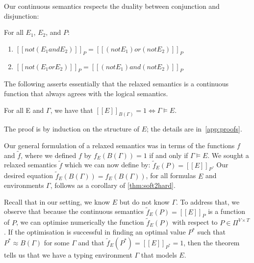 \documentclass[acmsmall,nonacm]{acmart}\settopmatter{printfolios=true,printccs=false,printacmref=false}
\newcommand{\qqpi}[2]{[\![#2]\!]_{#1}}
\begin{document}
Our continuous semantics respects the duality between conjunction and disjunction:
\begin{lemma}[Duality]
For all $E_1$, $E_2$, and $P$:
\begin{enumerate}
    \item $\qqpi{P}{\mathrel{not}(E_1 \mathrel{and} E_2)} = \qqpi{P}{(\mathrel{not} E_1) \mathrel{or} (\mathrel{not} E_2)}$
    \item $\qqpi{P}{\mathrel{not}(E_1 \mathrel{or} E_2)} = \qqpi{P}{(\mathrel{not} E_1) \mathrel{and} (\mathrel{not} E_2)}$
\end{enumerate}
\end{lemma}
\iffalse
\begin{verbatim}
    not(E1 and E2) = (not E1) or (not E2)

[LHS]P = 1 - ([E1]P * [E2]P)
[RHS]P = (1-[E1]P) or (1-[E2]P)
 = (1-[E1]P) + (1-[E2]P) - ((1-[E1]P) * (1-[E2]P))
 = (1-[E1]P) + (1-[E2]P) - (1 -[E1]P -[E2]P + ([E1]P * [E2]P))
 = (1-[E1]P) + (1-[E2]P) -  1 + [E1]P + [E2]P - ([E1]P * [E2]P))
 = 1 - ([E1]P * [E2]P)
\end{verbatim}
\begin{verbatim}
    not(E1 or E2) = (not E1) and (not E2)

[LHS]P = 1 - ([E1]P + [E2]P - ([E1]P * [E2]P))
 = 1 - [E1]P - [E2]P + ([E1]P * [E2]P)
[RHS]P = (1-[E1]P) * (1-[E2]P)
 = 1 -[E1]P - [E2]P + ([E1]P * [E2]P)
\end{verbatim}
\fi %

The following asserts essentially that the relaxed semantics is a continuous function that always agrees with the logical semantics.
\begin{theorem}[Relaxation]\label{thm:soft2hard}
For all E and $\Gamma$, we have that $\qqpi{B(\Gamma)}{E} = 1 \Leftrightarrow \Gamma \models E$.
\end{theorem}
The proof is by induction on the structure of $E$;
the details are in~\cref{app:proofs}.

Our general formulation of a relaxed semantics was in terms of the functions $f$ and $\tilde{f}$,
where we defined $f$ by $f_{E}(B(\Gamma)) = 1$ if and only if $\Gamma \models E$.
We sought a relaxed semantics $\tilde{f}$ which we can now define by: $\tilde{f}_E(P) = \qqpi{P}{E}$.
%
Our desired equation $\tilde{f}_{E}(B(\Gamma)) = f_E(B(\Gamma))$,
for all formulas $E$ and environments $\Gamma$,
follows as a corollary of \cref{thm:soft2hard}.

Recall that in our setting, we know $E$ but
do not know $\Gamma$.
To address that, we observe that because the continuous semantics $\tilde{f}_E(P) = \qqpi{P}{E}$ is a function of $P$, we can optimise numerically
the function $\tilde{f}_E(P)$ with respect to $P \in \Pi^{V \times T}$.
If the optimisation is successful in finding an optimal value $P^*$ such that
$P^* \approx B(\Gamma)$ for some $\Gamma$ and that $\tilde{f}_E(P^*) = \qqpi{P^*}{E} = 1$,
then the theorem tells us that we have a typing environment $\Gamma$ that models $E$.
\end{document}
